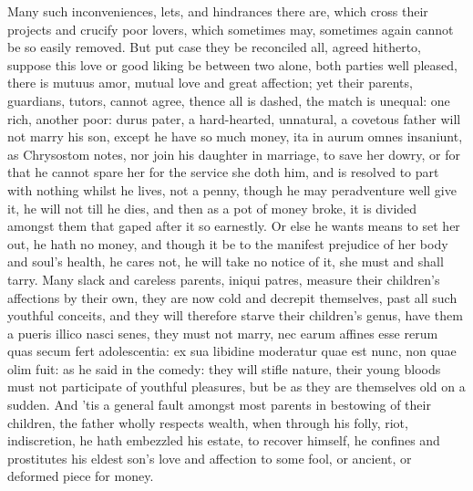 {Many such inconveniences, lets, and hindrances there are, which cross
their projects and crucify poor lovers, which sometimes may, sometimes
again cannot be so easily removed. But put case they be reconciled all,
agreed hitherto, suppose this love or good liking be between two alone,
both parties well pleased, there is mutuus amor, mutual love and great
affection; yet their parents, guardians, tutors, cannot agree, thence
all is dashed, the match is unequal: one rich, another poor: durus
pater, a hard-hearted, unnatural, a covetous father will not marry his
son, except he have so much money, ita in aurum omnes insaniunt, as
Chrysostom notes, nor join his daughter in marriage, to save her
dowry, or for that he cannot spare her for the service she doth him,
and is resolved to part with nothing whilst he lives, not a penny,
though he may peradventure well give it, he will not till he dies, and
then as a pot of money broke, it is divided amongst them that gaped
after it so earnestly. Or else he wants means to set her out, he hath
no money, and though it be to the manifest prejudice of her body and
soul's health, he cares not, he will take no notice of it, she must and
shall tarry. Many slack and careless parents, iniqui patres, measure
their children's affections by their own, they are now cold and
decrepit themselves, past all such youthful conceits, and they will
therefore starve their children's genus, have them a pueris 
illico nasci senes, they must not marry, nec earum affines esse rerum
quas secum fert adolescentia: ex sua libidine moderatur quae est nunc,
non quae olim fuit: as he said in the comedy: they will stifle nature,
their young bloods must not participate of youthful pleasures, but be
as they are themselves old on a sudden. And 'tis a general fault
amongst most parents in bestowing of their children, the father wholly
respects wealth, when through his folly, riot, indiscretion, he hath
embezzled his estate, to recover himself, he confines and prostitutes
his eldest son's love and affection to some fool, or ancient, or
deformed piece for money.

}
